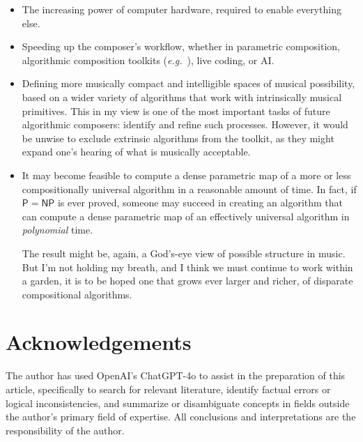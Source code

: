 \documentclass[]{interact}
\theoremstyle{plain}%
\theoremstyle{definition}
\theoremstyle{remark}
\begin{document}
\begin{itemize}
\item The increasing power of computer hardware, required to enable everything else.
\item Speeding up the composer's workflow, whether in parametric composition, algorithmic composition toolkits (\emph{e.g.}\ \citet{bellingham2019toward}), live coding, or AI.
\item Defining more musically compact and intelligible spaces of musical possibility, based on a wider variety of algorithms that work with intrinsically musical primitives. This in my view is one of the most important tasks of future algorithmic composers: identify and refine such processes. However, it would be unwise to exclude extrinsic algorithms from the toolkit, as they might expand one's hearing of what is musically acceptable.
\item  It may become feasible to compute a dense parametric map of a more or less compositionally universal algorithm in a reasonable amount of time. In fact, if $\mathsf{P} = \mathsf{NP}$ is ever proved, someone may succeed in creating an algorithm that can compute a dense parametric map of an effectively universal algorithm in \emph{polynomial} time. 

The result might be, again, a God's-eye view of possible structure in music. But I'm not holding my breath, and I think we must continue to work within a garden, it is to be hoped one that grows ever larger and richer, of disparate compositional algorithms.
\end{itemize}

\section*{Acknowledgements}

The author has used OpenAI's ChatGPT-4o to assist in the preparation of this article, specifically to search for relevant literature, identify factual errors or logical inconsistencies, and summarize or disambiguate concepts in fields outside the author's primary field of expertise. All conclusions and interpretations are the responsibility of the author.




\end{document}
